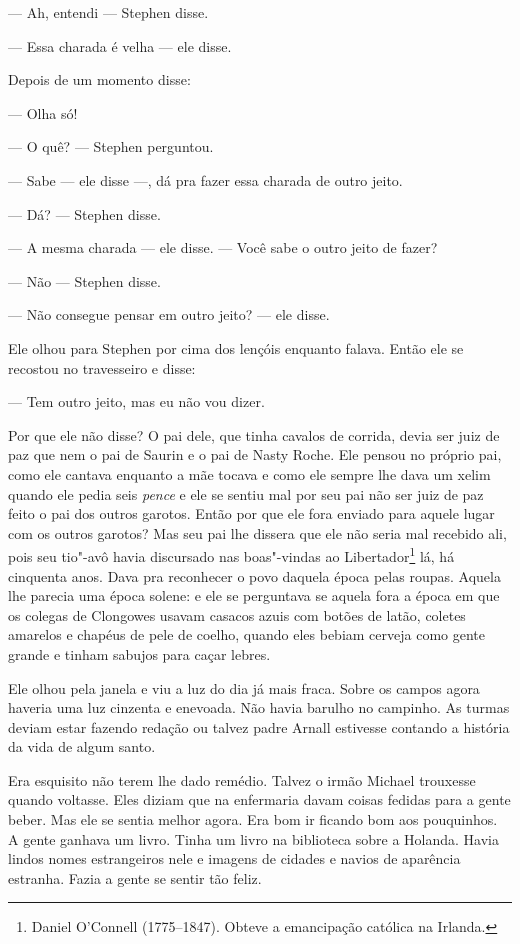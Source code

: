  --- Ah, entendi --- Stephen disse.

 --- Essa charada é velha --- ele disse.

Depois de um momento disse:

 --- Olha só!

 --- O quê? --- Stephen perguntou.

 --- Sabe --- ele disse ---, dá pra fazer essa charada de outro jeito.

 --- Dá? --- Stephen disse.

 --- A mesma charada --- ele disse. --- Você sabe o outro jeito de fazer?

 --- Não --- Stephen disse.

 --- Não consegue pensar em outro jeito? --- ele disse.

Ele olhou para Stephen por cima dos lençóis enquanto falava. Então ele
se recostou no travesseiro e disse:

 --- Tem outro jeito, mas eu não vou dizer.

Por que ele não disse? O pai dele, que tinha cavalos de corrida, devia
ser juiz de paz que nem o pai de Saurin e o pai de Nasty Roche. Ele pensou no
próprio pai, como ele cantava enquanto a mãe tocava e como ele sempre
lhe dava um xelim quando ele pedia seis \textit{pence} e ele se sentiu
mal por seu pai não ser juiz de paz feito o pai dos outros garotos. Então por que
ele fora enviado para aquele lugar com os outros garotos? Mas seu pai
lhe dissera que ele não seria mal recebido ali, pois seu tio"-avô havia
discursado nas boas"-vindas ao Libertador\footnote{ Daniel O’Connell
(1775--1847). Obteve a emancipação católica na Irlanda.} lá, há
cinquenta anos. Dava pra reconhecer o povo daquela época pelas roupas. 
Aquela lhe parecia uma época solene: e ele se perguntava se aquela fora
a época em que os colegas de Clongowes usavam casacos azuis com botões
de latão, coletes amarelos e chapéus de pele de coelho, quando eles
bebiam cerveja como gente grande e tinham sabujos para caçar lebres.

Ele olhou pela janela e viu a luz do dia já mais fraca. Sobre os campos
agora haveria uma luz cinzenta e enevoada. Não havia barulho no
campinho. As turmas deviam estar fazendo redação ou talvez padre Arnall
estivesse contando a história da vida de algum santo.

Era esquisito não terem lhe dado remédio. Talvez o irmão Michael
trouxesse quando voltasse. Eles diziam que na enfermaria davam coisas
fedidas para a gente beber. Mas ele se sentia melhor agora. Era bom ir 
ficando bom aos pouquinhos. A gente ganhava um livro. Tinha um livro na
biblioteca sobre a Holanda. Havia lindos nomes estrangeiros nele e
imagens de cidades e navios de aparência estranha. Fazia a gente se
sentir tão feliz.

